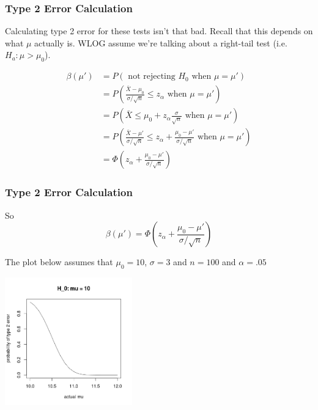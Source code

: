 \documentclass{beamer}
\begin{document}
\begin{frame}
\frametitle{Type 2 Error Calculation}

Calculating type 2 error for these tests isn't that bad. Recall that this depends on what $\mu$ actually is. WLOG assume we're talking about a right-tail test (i.e. $H_a: \mu > \mu_0$).

\begin{align*}
\beta(\mu') &= P( \text{ not rejecting $H_0$ when } \mu = \mu')\\
&= P\left( \frac{\bar{X} - \mu_0}{\sigma/\sqrt{n}} \le z_{\alpha} \text{ when } \mu = \mu'\right) \\
&= P(\bar{X} \le \mu_0 + z_{\alpha}\frac{\sigma}{\sqrt{n}} \text{ when } \mu = \mu') \\
&= P\left( \frac{\bar{X} - \mu'}{\sigma/ \sqrt{n}} \le z_{\alpha} + \frac{\mu_0 - \mu'}{\sigma / \sqrt{n}} \text{ when } \mu = \mu' \right) \\
&= \Phi \left( z_{\alpha} + \frac{\mu_0 - \mu'}{\sigma / \sqrt{n}} \right)
\end{align*}


\end{frame}
\begin{frame}
\frametitle{Type 2 Error Calculation}

So
\[
\beta(\mu') = \Phi \left( z_{\alpha} + \frac{\mu_0 - \mu'}{\sigma / \sqrt{n}} \right)
\]

The plot below assumes that $\mu_0 = 10$, $\sigma = 3$ and $n=100$ and $\alpha = .05$

\begin{center}
\includegraphics[width=55mm]{pics/type_2_error.png}
\end{center}

\end{frame}
\end{document}
